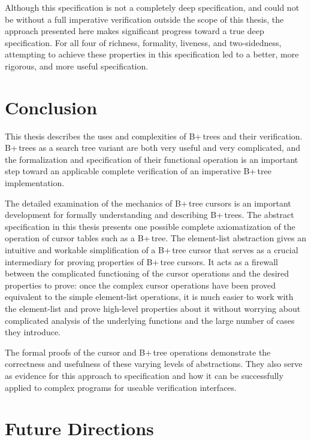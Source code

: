 \documentclass[12pt]{article}
\begin{document}
Although this specification is not a completely deep specification, and could not be without a full imperative verification outside the scope of this thesis, the approach presented here makes significant progress toward a true deep specification. For all four of richness, formality, liveness, and two-sidedness, attempting to achieve these properties in this specification led to a better, more rigorous, and more useful specification.

\clearpage

\section{Conclusion}

This thesis describes the uses and complexities of B+\,trees and their verification. B+\,trees as a search tree variant are both very useful and very complicated, and the formalization and specification of their functional operation is an important step toward an applicable complete verification of an imperative B+\,tree implementation.

The detailed examination of the mechanics of B+\,tree cursors is an important development for formally understanding and describing B+\,trees. The abstract specification in this thesis presents one possible complete axiomatization of the operation of cursor tables such as a B+\,tree. The element-list abstraction gives an intuitive and workable simplification of a B+\,tree cursor that serves as a crucial intermediary for proving properties of B+\,tree cursors. It acts as a firewall between the complicated functioning of the cursor operations and the desired properties to prove: once the complex cursor operations have been proved equivalent to the simple element-list operations, it is much easier to work with the element-list and prove high-level properties about it without worrying about complicated analysis of the underlying functions and the large number of cases they introduce.

The formal proofs of the cursor and B+\,tree operations demonstrate the correctness and usefulness of these varying levels of abstractions. They also serve as evidence for this approach to specification and how it can be successfully applied to complex programs for useable verification interfaces.

\clearpage

\section{Future Directions}
\end{document}
